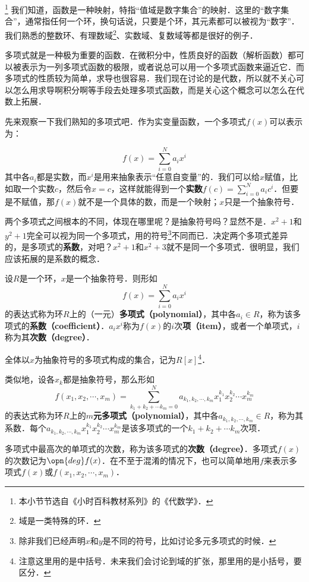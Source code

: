 

\footnote{本小节节选自《小时百科教材系列》的《代数学》．}
我们知道，函数是一种映射，特指“值域是数字集合”的映射．这里的“数字集合”，通常指任何一个环，换句话说，只要是个环，其元素都可以被视为“数字”．我们熟悉的整数环、有理数域\footnote{域是一类特殊的环．}、实数域、复数域等都是很好的例子．

多项式就是一种极为重要的函数．在微积分中，性质良好的函数（解析函数）都可以被表示为一列多项式函数的极限，或者说总可以用一个多项式函数来逼近它．而多项式的性质较为简单，求导也很容易．我们现在讨论的是代数，所以就不关心可以怎么用求导啊积分啊等手段去处理多项式函数，而是关心这个概念可以怎么在代数上拓展．

先来观察一下我们熟知的多项式吧．作为实变量函数，一个多项式$f(x)$可以表示为：

\begin{equation}
    f(x) = \sum_{i=0}^N a_i x^i
\end{equation}
其中各$a_i$都是实数，而$x^i$是用来抽象表示“任意自变量”的．我们可以给$x$赋值，比如取一个实数$c$，然后令$x=c$，这样就能得到一个\textbf{实数}$f(c)=\sum_{i=0}^N a_i c^i$．但要是不赋值，那$f(x)$就不是一个具体的数，而是一个映射；$x$只是一个抽象符号．

两个多项式之间根本的不同，体现在哪里呢？是抽象符号吗？显然不是．$x^2+1$和$y^2+1$完全可以视为同一个多项式，用的符号\footnote{除非我们已经声明$x$和$y$是不同的符号，比如讨论多元多项式的时候．}不同而已．决定两个多项式差异的，是多项式的\textbf{系数}，对吧？$x^2+1$和$x^2+3$就不是同一个多项式．很明显，我们应该拓展的是系数的概念．




\begin{definition}{}

设$R$是一个环，$x$是一个抽象符号．则形如
\begin{equation}
    f(x) = \sum_{i=0}^N a_i x^i
\end{equation}
的表达式称为环$R$上的（一元）\textbf{多项式（polynomial）}，其中各$a_i\in R$，称为该多项式的\textbf{系数（coefficient）}．$a_i x^i$称为$f(x)$的$i$次\textbf{项（item）}，或者一个单项式，$i$称为其\textbf{次数（degree）}．

全体以$x$为抽象符号的多项式构成的集合，记为$R[x]$\footnote{注意这里用的是中括号．未来我们会讨论到域的扩张，那里用的是小括号，要区分．}．

类似地，设各$x_k$都是抽象符号，那么形如
\begin{equation}
    f(x_1, x_2, \cdots, x_m) = \sum_{k_1+k_2+\cdots k_m=0}^N a_{k_1, k_2, \cdots, k_m} x_1^{k_1}x_2^{k_2}\cdots x_m^{k_m}
\end{equation}
的表达式称为环$R$上的\textbf{$m$元多项式（polynomial）}，其中各$a_{k_1, k_2, \cdots, k_m}\in R$，称为其系数．每个$a_{k_1, k_2, \cdots, k_m} x_1^{k_1}x_2^{k_2}\cdots x_m^{k_m}$是该多项式的一个$k_1+k_2+\cdots k_m$次项．

多项式中最高次的单项式的次数，称为该多项式的\textbf{次数（degree）}．多项式$f(x)$的次数记为$\opn{deg} f(x)$．在不至于混淆的情况下，也可以简单地用$f$来表示多项式$f(x)$或$f(x_1, x_2, \cdots, x_m)$．

\end{definition}

